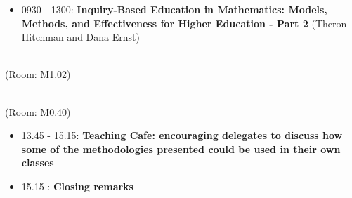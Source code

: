 \documentclass[a4paper]{article}
\begin{document}
\begin{itemize}
    \item 0930 - 1300: \textbf{Inquiry-Based Education in Mathematics: Models, Methods, and Effectiveness for Higher Education - Part 2} (Theron Hitchman and Dana Ernst)
\end{itemize}

\vspace{1cm}

\begin{center}
    \\
    \tiny{(Room: M1.02)}
\end{center}

\vspace{1cm}

\begin{center}
    \\
    \tiny{(Room: M0.40)}
\end{center}

\begin{itemize}
    \item 13.45 - 15.15: \textbf{Teaching Cafe: encouraging delegates to discuss how some of the methodologies presented could be used in their own classes}
    \item 15.15 : \textbf{Closing remarks}
\end{itemize}
\end{document}
